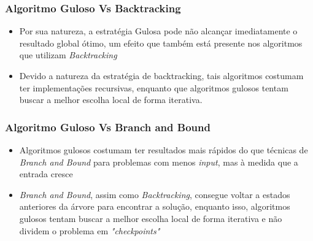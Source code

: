     \subsubsection{Algoritmo Guloso Vs Backtracking}

    \begin{itemize}
        \item Por sua natureza, a estratégia Gulosa pode não alcançar imediatamente 
        o resultado global ótimo, um efeito que também está presente nos algoritmos que utilizam \emph{Backtracking}
        \item Devido a natureza da estratégia de backtracking, tais algoritmos costumam ter 
        implementações recursivas, enquanto que algoritmos gulosos tentam 
        buscar a melhor escolha local de forma iterativa.
    \end{itemize}

    \subsubsection{Algoritmo Guloso Vs Branch and Bound}

    \begin{itemize}
        \item Algoritmos gulosos costumam ter resultados mais rápidos do que técnicas de 
        \emph{Branch and Bound} para problemas com menos \emph{input}, mas à medida que a entrada cresce
        \item \emph{Branch and Bound}, assim como \emph{Backtracking}, consegue voltar a estados anteriores 
        da árvore para encontrar a solução, enquanto isso, algoritmos gulosos tentam 
        buscar a melhor escolha local de forma iterativa e não dividem o problema em \emph{"checkpoints"}
    \end{itemize}

    \nocite{greedy-algorithm}

\newpage